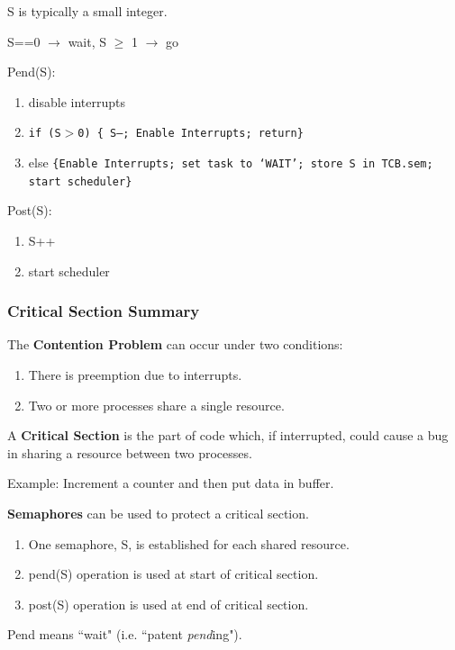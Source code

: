 S is typically a small integer.

S==0 $\to$ wait,  S $\geq$ 1 $\to$ go


Pend(S):
\begin{enumerate}
  \item disable interrupts
  \item {\tt if (S$>$0) \{ S--; Enable Interrupts; return\}}
  \item else {\tt \{Enable Interrupts; set task to `WAIT'; store S in TCB.sem;  start scheduler\}}
\end{enumerate}

Post(S):
\begin{enumerate}
  \item S++
  \item start scheduler
\end{enumerate}



\subsubsection{Critical Section Summary}

The {\bf Contention Problem} can occur under two conditions:
\begin{enumerate}
	\item There is preemption due to interrupts.
        \item Two or more processes share a single resource.
\end{enumerate}
A {\bf Critical Section} is the part of code which, if interrupted, could cause a bug in sharing a resource between
two processes.

Example:   Increment a counter and then put data in buffer.

{\bf Semaphores} can be used to protect a critical section.

\begin{enumerate}
	\item One semaphore, S,  is established for each shared resource.
        \item pend(S) operation is used at start of critical section.
        \item post(S) operation is used at end of critical section.
\end{enumerate}

Pend means ``wait" (i.e. ``patent {\it pend}ing").

